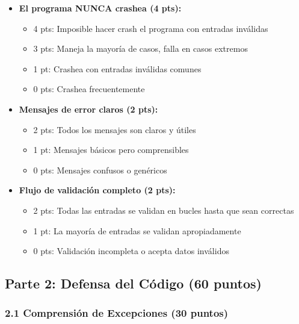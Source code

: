 \documentclass[12pt,a4paper]{article}
\begin{document}
\begin{itemize}[leftmargin=*]
    \item \textbf{El programa NUNCA crashea (4 pts):}
    \begin{itemize}
        \item 4 pts: Imposible hacer crash el programa con entradas inválidas
        \item 3 pts: Maneja la mayoría de casos, falla en casos extremos
        \item 1 pt: Crashea con entradas inválidas comunes
        \item 0 pts: Crashea frecuentemente
    \end{itemize}
    
    \item \textbf{Mensajes de error claros (2 pts):}
    \begin{itemize}
        \item 2 pts: Todos los mensajes son claros y útiles
        \item 1 pt: Mensajes básicos pero comprensibles
        \item 0 pts: Mensajes confusos o genéricos
    \end{itemize}
    
    \item \textbf{Flujo de validación completo (2 pts):}
    \begin{itemize}
        \item 2 pts: Todas las entradas se validan en bucles hasta que sean correctas
        \item 1 pt: La mayoría de entradas se validan apropiadamente
        \item 0 pts: Validación incompleta o acepta datos inválidos
    \end{itemize}
\end{itemize}

\subsection{Parte 2: Defensa del Código (60 puntos)}

\subsubsection{2.1 Comprensión de Excepciones (30 puntos)}
\end{document}
